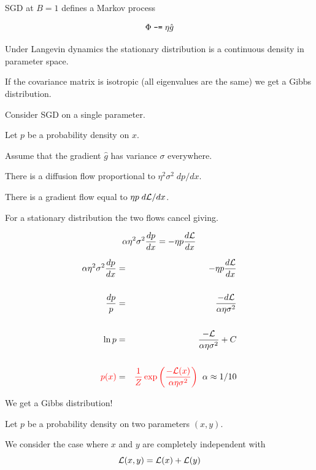 {

SGD at $B = 1$ defines a Markov process

$$\Phi \;\mbox{\tt -=} \; \eta \hat{g}$$

\vfill
Under Langevin dynamics the stationary distribution is a continuous density in parameter space.

\vfill
If the covariance matrix is isotropic (all eigenvalues are the same) we get a Gibbs distribution.



Consider SGD on a single parameter.

\vfill
Let $p$ be a probability density on $x$.

\vfill
Assume that the gradient $\hat{g}$ has variance $\sigma$ everywhere.

\vfill
There is a diffusion flow proportional to $\eta^2\sigma^2\;dp/dx$.

\vfill
There is a gradient flow equal to $\eta p \;d {\cal L}/dx$.

\vfill
For a stationary distribution the two flows cancel giving.

\vfill
{\color{red} $$\alpha \eta^2 \sigma^2 \frac{dp}{dx} = - \eta p\frac{d{\cal L}}{dx}$$}



\vspace{-2ex}
\begin{eqnarray*}
\alpha \eta^2 \sigma^2 \frac{dp}{dx} & = & - \eta p\frac{d{\cal L}}{dx} \\
\\
\frac{dp}{p} & = & \frac{-d{\cal L}}{\alpha\eta\sigma^2} \\
\\
\ln p & = & \frac{-{\cal L}}{\alpha \eta \sigma^2} + C \\
\\
{\color{red} p(x)} & = & {\color{red} \frac{1}{Z}\exp\left(\frac{-{\cal L}(x)}{\alpha \eta \sigma^2}\right)}\;\;\alpha \approx 1/10
\end{eqnarray*}

\vfill
We get a Gibbs distribution!


Let $p$ be a probability density on two parameters $(x,y)$.

\vfill
We consider the case where $x$ and $y$ are completely independent with
$${\cal L}(x,y) = {\cal L}(x) + {\cal L}(y)$$

}
